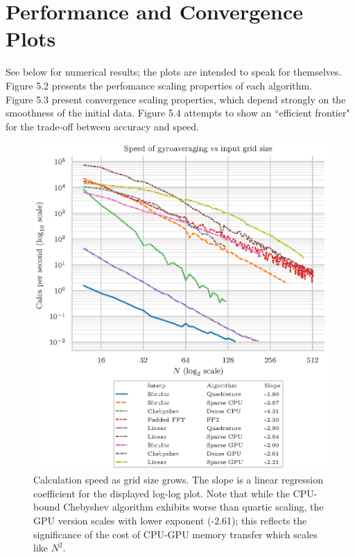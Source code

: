 	\section{Performance and Convergence Plots}
	See below for numerical results; the plots are intended to speak for themselves.
Figure 5.2 presents the perfomance scaling properties of each algorithm.  \\
Figure 5.3 present convergence scaling properties, which depend strongly on the smoothness of the initial data.  Figure 5.4 attempts to show an ``efficient frontier" for the trade-off between accuracy and speed.

	
	\begin{figure}[htbp!] 
 \includegraphics[scale=1]{SpeedVsN.eps}	
 	\caption[Gyroaveraging speed vs grid size]{Calculation speed as grid size grows.  The slope is a linear regression coefficient for the displayed log-log plot.   Note that while the CPU-bound Chebyshev algorithm exhibits worse than quartic scaling, the GPU version scales with lower exponent (-2.61); this reflects the significance of the cost of CPU-GPU memory transfer which scales like $N^2$. }  	\end{figure}
	
